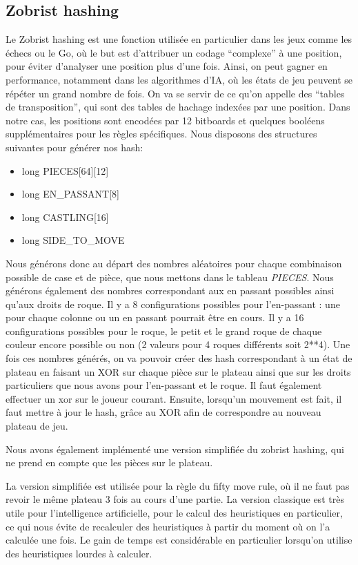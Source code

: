 \documentclass{article}
\begin{document}
\subsection{Zobrist hashing} \label{Zobrist}
Le Zobrist hashing est une fonction utilisée en particulier dans les jeux comme les échecs ou le Go, où le but est d'attribuer un codage ``complexe'' à
une position, pour éviter d'analyser une position plus d'une fois. Ainsi, on peut gagner en performance, notamment dans les algorithmes d'IA, où les
états de jeu peuvent se répéter un grand nombre de fois. On va se servir de ce qu'on appelle des ``tables de transposition'', qui sont des tables de
hachage indexées par une position. Dans notre cas, les positions sont encodées par 12 bitboards et quelques booléens
supplémentaires pour les règles spécifiques.
Nous disposons des structures suivantes pour générer nos hash:
\begin{itemize}
    \item long PIECES[64][12]
    \item long EN\_PASSANT[8]
    \item long CASTLING[16]
    \item long SIDE\_TO\_MOVE
\end{itemize}

Nous générons donc au départ des nombres aléatoires pour chaque combinaison possible de case et de pièce, que nous mettons dans le tableau \textit{PIECES}.
Nous générons également des nombres correspondant aux en passant possibles ainsi qu'aux droits de roque. Il y a 8 configurations possibles pour l'en-passant :
une pour chaque colonne ou un en passant pourrait être en cours.
Il y a 16 configurations possibles pour le roque, le petit et le grand roque de chaque couleur encore possible ou non (2 valeurs pour 4 roques différents soit 2**4).
Une fois ces nombres générés, on va pouvoir créer des hash correspondant à un état de plateau en faisant un XOR sur chaque pièce sur le plateau ainsi que sur
les droits particuliers que nous avons pour l'en-passant et le roque. Il faut également effectuer un xor sur le joueur courant.
Ensuite, lorsqu'un mouvement est fait, il faut mettre à jour le hash, grâce au XOR afin de correspondre au nouveau plateau de jeu.

Nous avons également implémenté une version simplifiée du zobrist hashing, qui ne prend en compte que les pièces sur le plateau.

La version simplifiée est utilisée pour la règle du fifty move rule, où il ne faut pas revoir le même plateau 3 fois au cours d'une partie.
La version classique est très utile pour l'intelligence artificielle, pour le calcul des heuristiques en particulier, ce qui nous évite de recalculer des heuristiques
à partir du moment où on l'a calculée une fois. Le gain de temps est considérable en particulier lorsqu'on utilise des heuristiques lourdes à calculer.
\end{document}
